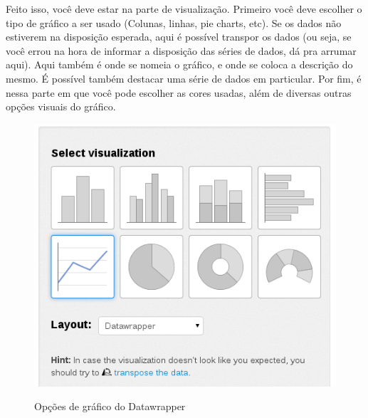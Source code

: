 \documentclass[12pt,onecolumn]{article}
\begin{document}
    Feito isso, você deve estar na parte de visualização. Primeiro você deve escolher
    o tipo de gráfico a ser usado (Colunas, linhas, pie charts, etc). Se os dados não
    estiverem na disposição esperada, aqui é possível transpor os dados (ou seja, se
    você errou na hora de informar a disposição das séries de dados, dá pra arrumar 
    aqui). Aqui também é onde se nomeia o gráfico, e onde se coloca a descrição do
    mesmo. É possível também destacar uma série de dados em particular. Por fim, 
    é nessa parte em que você pode escolher as cores usadas, além de diversas outras
    opções visuais do gráfico.
    
    \begin{figure}[H]
      \begin{center}
        \includegraphics[scale=0.4]{datawrapper-charts.png}
        \label{fig:datawrapper-charts}
        \caption{Opções de gráfico do Datawrapper}
      \end{center}
    \end{figure}
    
\end{document}
